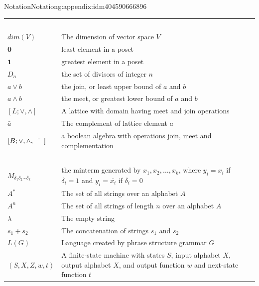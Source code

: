 \documentclass[twoside,10pt,]{book}
\numberwithin{equation}{section}
\begin{document}
\begin{appendixptx}{Notation}{}{Notation}{}{}{g:appendix:idm404590666896}
\begin{longtable}[l]{lp{}r}
\(\)&&\pageref{g:notation:idm404593843120}\\
\(dim(V)\)&The dimension of vector space \(V\)&\pageref{g:notation:idm404593728688}\\
\(\pmb{0}\)&least element in a poset&\pageref{g:notation:idm404593174016}\\
\(\pmb{1}\)&greatest element in a poset&\pageref{g:notation:idm404593173376}\\
\(D_n\)&the set of divisors of integer \(n\)&\pageref{g:notation:idm404593155056}\\
\(a \lor b\)&the join, or least upper bound of \(a\) and \(b\)&\pageref{g:notation:idm404593094672}\\
\(a \land b\)&the meet, or greatest lower bound of \(a\) and \(b\)&\pageref{g:notation:idm404593093312}\\
\([L;\lor,\land]\)&A lattice with domain having meet and join operations&\pageref{g:notation:idm404593082832}\\
\(\bar{a}\)&The complement of lattice element \(a\)&\pageref{g:notation:idm404593004160}\\
\([B;  \lor , \land, \bar{\hspace{5 mm}}]\)&a boolean algebra with operations join, meet and complementation&\pageref{g:notation:idm404592992912}\\
\(\)&&\pageref{g:notation:idm404592964912}\\
\(M_{\delta_1 \delta_2 \cdots \delta_k}\)&the minterm generated by \(x_1, x_2, \ldots , x_k\), where  \(y_i=x_i\) if \(\delta_i = 1\) and \(y_i=\bar{x_i}\) if \(\delta_i = 0\)&\pageref{g:notation:idm404592703056}\\
\(A^*\)&The set of all strings over an alphabet \(A\)&\pageref{g:notation:idm404592371776}\\
\(A^n\)&The set of all strings of length \(n\) over an alphabet \(A\)&\pageref{g:notation:idm404592370704}\\
\(\lambda\)&The empty string&\pageref{g:notation:idm404592369312}\\
\(s_1+s_2\)&The concatenation of strings \(s_1\) and \(s_2\)&\pageref{g:notation:idm404592335136}\\
\(L(G)\)&Language created by phrase structure grammar \(G\)&\pageref{g:notation:idm404646906544}\\
\((S, X, Z, w, t)\)&A finite-state machine with states \(S\), input alphabet \(X\), output alphabet \(X\), and output function \(w\) and next-state function \(t\)&\pageref{g:notation:idm404598481296}\\

\end{longtable}
\end{appendixptx}
\end{document}
